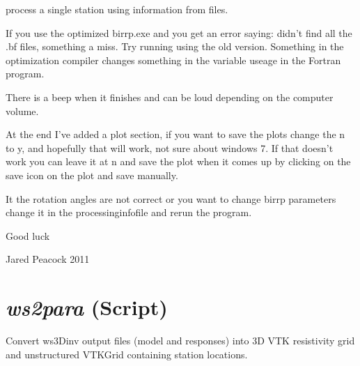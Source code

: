 process a single station using information from files. 

If you use the optimized birrp.exe and you get an error saying: didn't find all
the .bf files, something a miss.  Try running using the old version.  Something
in the optimization compiler changes something in the variable useage in the
Fortran program.  

There is a beep when it finishes and can be loud depending on the computer
volume.

At the end I've added a plot section, if you want to save the plots change
the n to y, and hopefully that will work, not sure about windows 7.  If that 
doesn't work you can leave it at n and save the plot when it comes up by
clicking on the save icon on the plot and save manually.

It the rotation angles are not correct or you want to change birrp parameters
change it in the processinginfofile and rerun the program.

Good luck

Jared Peacock 2011

\section{\textit{ws2para} (Script)}
\label{sec:utils.ws2para}

Convert ws3Dinv output files (model and responses) into 3D VTK resistivity grid
    and unstructured VTKGrid containing station locations.
